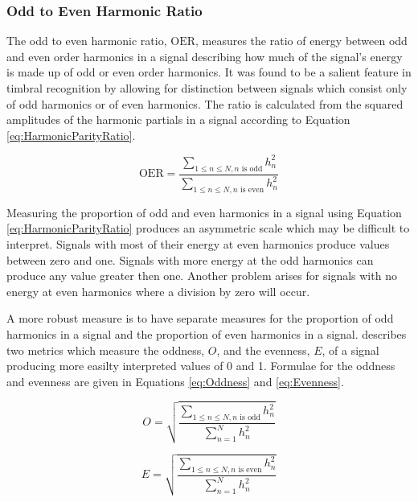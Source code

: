 		\subsubsection*{Odd to Even Harmonic Ratio}
			The odd to even harmonic ratio, $\textrm{OER}$, measures the ratio of energy between odd and even
			order harmonics in a signal describing how much of the signal's energy is made up of odd or even
			order harmonics. It was found to be a salient feature in timbral recognition by
			\citet{hall2010importance} allowing for distinction between signals which consist only of odd
			harmonics or of even harmonics. The ratio is calculated from the squared amplitudes of the harmonic
			partials in a signal according to Equation \ref{eq:HarmonicParityRatio}.
			
			\begin{equation}
				\textrm{OER} = \frac{\sum_{1 \leq n \leq N, n \textrm{ is odd}} h_{n}^{2}}
					       {\sum_{1 \leq n \leq N, n \textrm{ is even}} h_{n}^{2}}
				\label{eq:HarmonicParityRatio}
			\end{equation}

			Measuring the proportion of odd and even harmonics in a signal using Equation
			\ref{eq:HarmonicParityRatio} produces an asymmetric scale which may be difficult to interpret.
			Signals with most of their energy at even harmonics produce values between zero and one.  Signals
			with more energy at the odd harmonics can produce any value greater then one. Another problem
			arises for signals with no energy at even harmonics where a division by zero will occur.

			A more robust measure is to have separate measures for the proportion of odd harmonics in a signal
			and the proportion of even harmonics in a signal. \citet{lukasik2005towards} describes two metrics
			which measure the oddness, $O$, and the evenness, $E$, of a signal producing more easilty
			interpreted values of 0 and 1. Formulae for the oddness and evenness are given in Equations
			\ref{eq:Oddness} and \ref{eq:Evenness}.

			\begin{equation}
				O = \sqrt{\frac{\sum_{1 \leq n \leq N, n \textrm{ is odd}} h_{n}^{2}}
					       {\sum_{n = 1}^{N} h_{n}^{2}}}
				\label{eq:Oddness}
			\end{equation}

			\begin{equation}
				E = \sqrt{\frac{\sum_{1 \leq n \leq N, n \textrm{ is even}} h_{n}^{2}}
					       {\sum_{n = 1}^{N} h_{n}^{2}}}
				\label{eq:Evenness}
			\end{equation}

